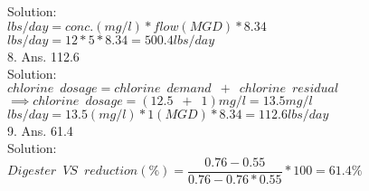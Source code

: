 Solution:\\
$lbs/day=conc. (mg/l)*flow(MGD)*8.34$\\
$lbs/day=12*5*8.34=\boxed{500.4lbs/day}$\\

\vspace{0.3cm}
8.	Ans.  112.6\\

\vspace{0.3cm}
Solution: \\
$ chlorine \enspace dosage = chlorine \enspace demand \enspace + \enspace chlorine \enspace residual$\\
$\implies chlorine \enspace dosage = (12.5 \enspace + \enspace 1 )mg/l=13.5 mg/l$\\
$lbs/day=13.5(mg/l)*1(MGD)*8.34=\boxed{112.6 lbs/day}$\\

\vspace{0.3cm}
9.	Ans.  61.4\\
Solution:\\
$Digester \enspace VS \enspace reduction (\%)=\dfrac{0.76-0.55}{0.76-0.76*0.55}*100=\boxed{ 61.4\%}$\\





